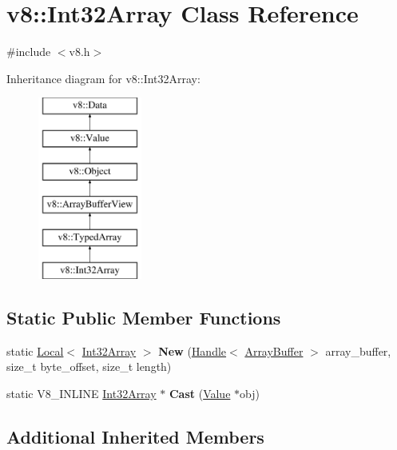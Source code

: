 \hypertarget{classv8_1_1Int32Array}{}\section{v8\+:\+:Int32\+Array Class Reference}
\label{classv8_1_1Int32Array}


{\ttfamily \#include $<$v8.\+h$>$}

Inheritance diagram for v8\+:\+:Int32\+Array\+:\begin{figure}[H]
\begin{center}
\leavevmode
\includegraphics[height=6.000000cm]{classv8_1_1Int32Array}
\end{center}
\end{figure}
\subsection*{Static Public Member Functions}
\begin{DoxyCompactItemize}
\item 
\hypertarget{classv8_1_1Int32Array_a41fa255626b8e00e9cc9f5d4e0c518d5}{}static \hyperlink{classv8_1_1Local}{Local}$<$ \hyperlink{classv8_1_1Int32Array}{Int32\+Array} $>$ {\bfseries New} (\hyperlink{classv8_1_1Handle}{Handle}$<$ \hyperlink{classv8_1_1ArrayBuffer}{Array\+Buffer} $>$ array\+\_\+buffer, size\+\_\+t byte\+\_\+offset, size\+\_\+t length)\label{classv8_1_1Int32Array_a41fa255626b8e00e9cc9f5d4e0c518d5}

\item 
\hypertarget{classv8_1_1Int32Array_afe7cdf534deadc3d872d8a43778809f1}{}static V8\+\_\+\+I\+N\+L\+I\+N\+E \hyperlink{classv8_1_1Int32Array}{Int32\+Array} $\ast$ {\bfseries Cast} (\hyperlink{classv8_1_1Value}{Value} $\ast$obj)\label{classv8_1_1Int32Array_afe7cdf534deadc3d872d8a43778809f1}

\end{DoxyCompactItemize}
\subsection*{Additional Inherited Members}


